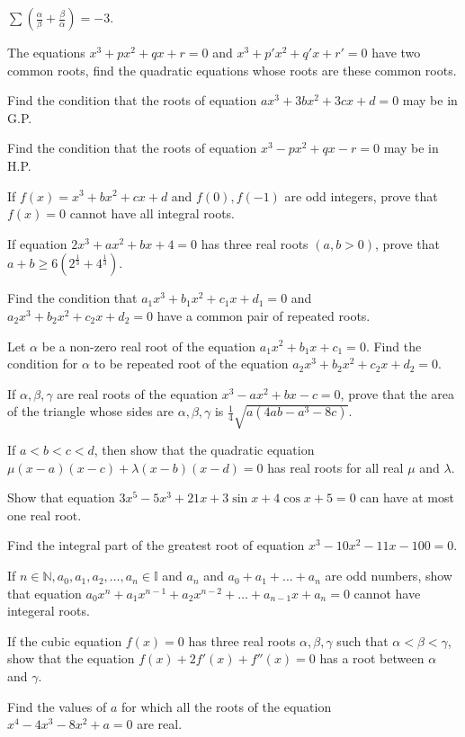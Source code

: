   $\displaystyle\sum\left(\frac{\alpha}{\beta} + \frac{\beta}{\alpha}\right) = -3$.
\item The equations $x^3 + px^2 + qx + r = 0$ and $x^3 + p'x^2 + q'x + r' = 0$ have two common roots, find the quadratic equations
  whose roots are these common roots.
\item Find the condition that the roots of equation $ax^3 + 3bx^2 + 3cx + d = 0$ may be in G.P.
\item Find the condition that the roots of equation $x^3 - px^2 + qx - r = 0$ may be in H.P.
\item If $f(x) = x^3 + bx^2 + cx + d$ and $f(0), f(-1)$ are odd integers, prove that $f(x) = 0$ cannot have all integral roots.
\item If equation $2x^3 + ax^2 + bx + 4 = 0$ has three real roots $(a, b > 0)$, prove that $a + b\geq 6(2^{\tfrac{1}{3}} +
  4^{\tfrac{1}{3}})$.
\item Find the condition that $a_1x^3 + b_1x^2 + c_1x + d_1 = 0$ and $a_2x^3 + b_2x^2 + c_2x + d_2 = 0$ have a common pair of
  repeated roots.
\item Let $\alpha$ be a non-zero real root of the equation $a_1x^2 + b_1x + c_1 = 0$. Find the condition for $\alpha$ to be
  repeated root of the equation $a_2x^3 + b_2x^2 + c_2x + d_2 = 0$.
\item If $\alpha, \beta, \gamma$ are real roots of the equation $x^3 - ax^2 + bx - c = 0$, prove that the area of the triangle
  whose sides are $\alpha, \beta, \gamma$ is $\frac{1}{4}\sqrt{a(4ab - a^3 - 8c)}$.
\item If $a<b<c<d$, then show that the quadratic equation $\mu(x - a)(x - c) + \lambda(x - b)(x - d) = 0$ has real roots for all
  real $\mu$ and $\lambda$.
\item Show that equation $3x^5 - 5x^3 + 21x + 3\sin x + 4\cos x + 5 = 0$ can have at most one real root.
\item Find the integral part of the greatest root of equation $x^3 - 10x^2 - 11x - 100 = 0$.
\item If $n\in\mathbb{N}, a_0, a_1, a_2, \ldots, a_n\in\mathbb{I}$ and $a_n$ and $a_0 + a_1 + \ldots + a_n$ are odd numbers, show
  that equation $a_0x^n + a_1x^{n - 1} + a_2x^{n - 2} + \ldots + a_{n - 1}x + a_n = 0$ cannot have integeral roots.
\item If the cubic equation $f(x) = 0$ has three real roots $\alpha, \beta, \gamma$ such that $\alpha <\beta <\gamma$, show that
  the equation $f(x) + 2f'(x) + f''(x) = 0$ has a root between $\alpha$ and $\gamma$.
\item Find the values of $a$ for which all the roots of the equation $x^4 - 4x^3 - 8x^2 + a = 0$ are real.
